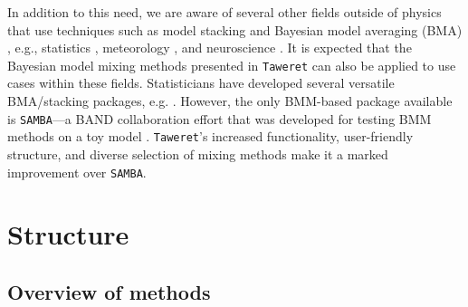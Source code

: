 \documentclass[10pt, preprint,aps,prc,floatfix,
tightenlines,
nofootinbib,superscriptaddress]{revtex4-2}
\begin{document}
In addition to this need, we are aware of several other fields outside of physics that use techniques such as model stacking and Bayesian model averaging (BMA) \cite{Fragoso2018}, e.g., statistics \cite{Yao2018, Yao2022}, meteorology \cite{Sloughter2007}, and neuroscience \cite{FitzGerald2014}. It is expected that the Bayesian model mixing methods presented in \texttt{Taweret} can also be applied to use cases within these fields. 
Statisticians have developed several versatile BMA/stacking packages, e.g. \cite{loo, BMA_R}. However, the only BMM-based package available is \texttt{SAMBA}---a BAND collaboration effort that was developed for testing BMM methods on a toy model \cite{Semposki:2022gcp}. \texttt{Taweret}'s increased functionality, user-friendly structure, and diverse selection of mixing methods make it a marked improvement over \texttt{SAMBA}. 

\section{Structure}

\subsection{Overview of methods}
\end{document}
